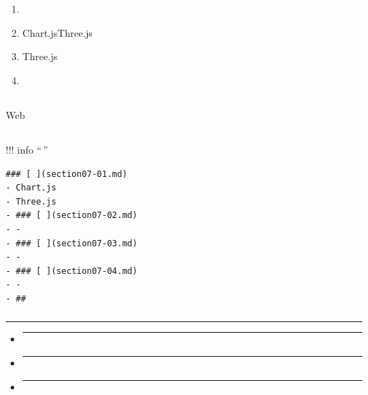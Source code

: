 \section{}\label{section}

\subsection{}\label{section-1}

\begin{enumerate}
\def\labelenumi{\arabic{enumi}.}
\tightlist
\item
\item
  Chart.jsThree.js
\item
  Three.js
\item
\end{enumerate}

\subsection{}\label{section-2}

Web

\subsection{}\label{section-3}

!!! info ``\,''

\begin{verbatim}
### [ ](section07-01.md)
- Chart.js
- Three.js
- ### [ ](section07-02.md)
- - 
- ### [ ](section07-03.md)
- - 
- ### [ ](section07-04.md)
- - 
- ## 
\end{verbatim}

\subsubsection{}\label{section-4}

\begin{center}\rule{0.5\linewidth}{0.5pt}\end{center}

\begin{itemize}
\item
  \begin{center}\rule{0.5\linewidth}{0.5pt}\end{center}
\item
  \begin{center}\rule{0.5\linewidth}{0.5pt}\end{center}
\item
  \begin{center}\rule{0.5\linewidth}{0.5pt}\end{center}
\end{itemize}

